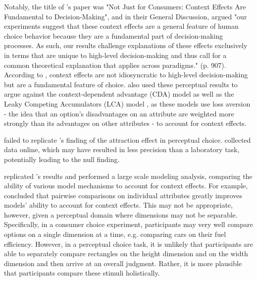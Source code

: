 Notably, the title of \textcite{trueblood2013not}'s paper was "Not Just for Consumers: Context Effects Are Fundamental to Decision-Making", and in their General Discussion, \textcite{trueblood2013not} argued "our experiments suggest that these context effects are a general feature of human choice behavior because they are a fundamental part of decision-making processes. As such, our results challenge explanations of these effects exclusively in terms that are unique to high-level decision-making and thus call for a common theoretical explanation that applies across paradigms." (p. 907). According to \textcite{trueblood2013not}, context effects are not idiosyncratic to high-level decision-making but are a fundamental feature of choice. \textcite{trueblood2013not} also used these perceptual results to argue against the context-dependent advantage (CDA) model \parencite{tversky1993context} as well as the Leaky Competing Accumulators (LCA) model \parencite{usherLossAversionInhibition2004a}, as these models use loss aversion - the idea that an option's disadvantages on an attribute are weighted more strongly than its advantages on other attributes - to account for context effects. 

\textcite{frederickLimitsAttraction2014b} failed to replicate \textcite{trueblood2013not}'s finding of the attraction effect in perceptual choice. \textcite{frederickLimitsAttraction2014b} collected data online, which may have resulted in less precision than a laboratory task, potentially leading to the null finding.

\textcite{turnerCompetingTheoriesMultialternative2018a} replicated \textcite{trueblood2013not}'s results and performed a large scale modeling analysis, comparing the ability of various model mechanisms to account for context effects. For example, \textcite{turnerCompetingTheoriesMultialternative2018a} concluded that pairwise comparisons on individual attributes greatly improves models' ability to account for context effects. This may not be appropriate, however, given a perceptual domain where dimensions may not be separable. Specifically, in a consumer choice experiment, participants may very well compare options on a single dimension at a time, e.g. comparing cars on their fuel efficiency. However, in a perceptual choice task, it is unlikely that participants are able to separately compare rectangles on the height dimension and on the width dimension and then arrive at an overall judgment. Rather, it is more plausible that participants compare these stimuli holistically.

